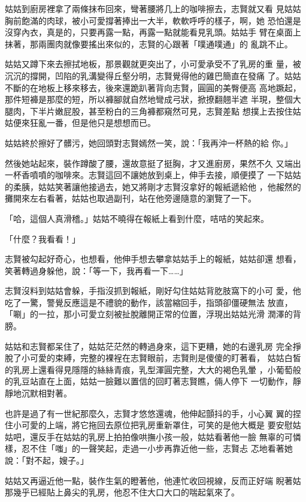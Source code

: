 姑姑到廚房裡拿了兩條抹布回來，彎著腰將几上的咖啡擦去，志賢就又看
見姑姑胸前飽滿的肉球，被小可愛撐著捧出一大半，軟軟呼呼的樣子，啊，她
恐怕還是沒穿內衣，真是的，只要再露一點，再露一點就能看見乳頭。姑姑手
臂在桌面上抹著，那兩團肉就像要搖出來似的，志賢的心跟著「噗通噗通」的
亂跳不止。

姑姑又蹲下來去擦拭地板，那景觀就更突出了，小可愛承受不了乳房的重
量，被沉沉的撐開，凹陷的乳溝變得丘壑分明，志賢覺得他的雞巴簡直在發痛
了。姑姑不斷的在地板上移來移去，後來還跪趴著背向志賢，圓圓的美臀便高
高地蹶起，那件短褲是那麼的短，所以褲腳就自然地彎成弓狀，掀撩翻翹半遮
半現，整個大腿肉，下半片嫩屁股，甚至粉白的三角褲都窺然可見，志賢差點
想撲上去按住姑姑便來狂亂一番，但是他只是想想而已。

姑姑終於擦好了髒污，她回頭對志賢嫣然一笑，說：「我再沖一杯熱的給
你。」

然後她站起來，裝作蹲酸了腰，還故意挺了挺胸，才又進廚房，果然不久
又端出一杯香噴噴的咖啡來。志賢這回不讓她放到桌上，伸手去接，順便摸了
一下姑姑的柔胰，姑姑笑著讓他接過去，她又將剛才志賢沒拿好的報紙遞給他
，他赧然的攤開來左右看著，姑姑也取過副刊，站在他旁邊隨意的瀏覽了一下。

「哈，這個人真滑稽。」姑姑不曉得在報紙上看到什麼，咭咭的笑起來。

「什麼？我看看！」

志賢被勾起好奇心，也想看，他伸手想去攀拿姑姑手上的報紙，姑姑卻還
想看，笑著轉過身躲他，說：「等一下，我再看一下……」

志賢沒料到姑姑會躲，手指沒抓到報紙，剛好勾住姑姑背肐肢窩下的小可
愛，他吃了一驚，警覺反應這是不禮貌的動作，該當縮回手，指頭卻僵硬無法
放直，「唰」的一拉，那小可愛立刻被扯脫離開正常的位置，浮現出姑姑光滑
潤澤的背膀。

姑姑和志賢都呆住了，姑姑茫茫然的轉過身來，這下更糟，她的右邊乳房
完全掙脫了小可愛的束縛，完整的裸裎在志賢眼前，志賢則是傻傻的盯著看，
姑姑白皙的乳房上還看得見隱隱的絲絲青痕，乳型渾圓完整，大大的褐色乳暈
，小葡萄般的乳豆站直在上面，姑姑一臉難以置信的回盯著志賢瞧，倆人停下
一切動作，靜靜地沉默相對著。

也許是過了有一世紀那麼久，志賢才悠悠還魂，他伸起顫抖的手，小心翼
翼的捏住小可愛的上端，將它拖回去原位把乳房重新罩住，可笑的是他大概是
要安慰姑姑吧，還反手在姑姑的乳房上拍拍像哄撫小孩一般，姑姑看著他一臉
無辜的可憐樣，忍不住「嗤」的一聲笑起，走過一小步再靠近他一些，志賢忐
忑地看著她說：「對不起，嫂子。」

姑姑又再逼近他一點，裝作生氣的瞪著他，他連忙收回視線，反而正好端
睨著姑那幾乎已經貼上鼻尖的乳房，他忍不住大口大口的喘起氣來了。

